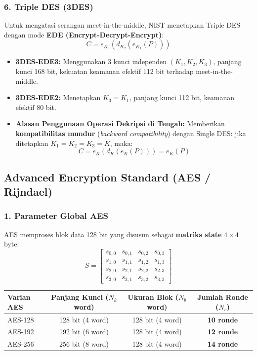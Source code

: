 \documentclass[11pt,a4paper]{article}
\begin{document}
\subsubsection{6. Triple DES (3DES)}
Untuk mengatasi serangan meet-in-the-middle, NIST menetapkan Triple DES dengan mode \textbf{EDE (Encrypt-Decrypt-Encrypt)}:
\[
C = e_{K_3}(d_{K_2}(e_{K_1}(P)))
\]
\begin{itemize}[leftmargin=*]
    \item \textbf{3DES-EDE3:} Menggunakan 3 kunci independen $(K_1, K_2, K_3)$, panjang kunci 168 bit, kekuatan keamanan efektif 112 bit terhadap meet-in-the-middle.
    \item \textbf{3DES-EDE2:} Menetapkan $K_3 = K_1$, panjang kunci 112 bit, keamanan efektif 80 bit.
    \item \textbf{Alasan Penggunaan Operasi Dekripsi di Tengah:} Memberikan \textbf{kompatibilitas mundur} (\textit{backward compatibility}) dengan Single DES: jika ditetapkan $K_1 = K_2 = K_3 = K$, maka:
    \[
    C = e_K(d_K(e_K(P))) = e_K(P)
    \]
\end{itemize}

\subsection{Advanced Encryption Standard (AES / Rijndael)}

\subsubsection{1. Parameter Global AES}
AES memproses blok data 128 bit yang disusun sebagai \textbf{matriks state} $4 \times 4$ byte:
\[
S = \begin{bmatrix}
s_{0,0} & s_{0,1} & s_{0,2} & s_{0,3} \\
s_{1,0} & s_{1,1} & s_{1,2} & s_{1,3} \\
s_{2,0} & s_{2,1} & s_{2,2} & s_{2,3} \\
s_{3,0} & s_{3,1} & s_{3,2} & s_{3,3}
\end{bmatrix}
\]
\begin{table}[H]
\centering
\small
\begin{tabular}{l c c c}
\toprule
\textbf{Varian AES} & \textbf{Panjang Kunci ($N_k$ word)} & \textbf{Ukuran Blok ($N_b$ word)} & \textbf{Jumlah Ronde ($N_r$)} \\
\midrule
AES-128 & 128 bit (4 word) & 128 bit (4 word) & \textbf{10 ronde} \\
AES-192 & 192 bit (6 word) & 128 bit (4 word) & \textbf{12 ronde} \\
AES-256 & 256 bit (8 word) & 128 bit (4 word) & \textbf{14 ronde} \\
\bottomrule
\end{tabular}
\end{table}
\end{document}
